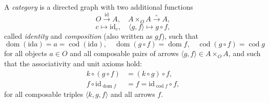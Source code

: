 A \emph{category} is a directed graph with two additional functions
$$O \xrightarrow{\text{id}} A, \quad A \times_O A \xrightarrow{\circ} A,$$
$$c \longmapsto \text{id}_c, \quad \langle g, f \rangle \longmapsto g \circ f,$$
called \emph{identity} and \emph{composition} (also written as $gf$), such that
$$\operatorname{dom}(\text{id} a) = a = \operatorname{cod}(\text{id} a), \quad \operatorname{dom}(g \circ f) = \operatorname{dom} f, \quad \operatorname{cod}(g \circ f) = \operatorname{cod} g$$
for all objects $a \in O$ and all composable pairs of arrows $\langle g, f \rangle \in A \times_O A$, and such that the associativity and unit axioms hold:
\begin{align}
k \circ (g \circ f) &= (k \circ g) \circ f, \\
f \circ \text{id}_{\operatorname{dom} f} &= f = \text{id}_{\operatorname{cod} f} \circ f,
\end{align}
for all composable triples $\langle k, g, f\rangle$ and all arrows $f$.
